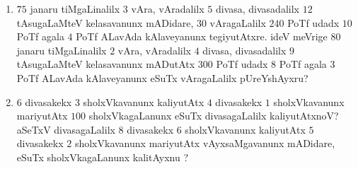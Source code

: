 \begin{enumerate}[\rm (1)]
\item $75$ janaru tiMgaLinalilx $3$ vAra, vAradalilx $5$ divasa, divasadalilx $12$ tAsugaLaMteV kelasavanunx mADidare, $30$ vAragaLalilx $240$ PoTf udadx $10$ PoTf agala $4$ PoTf ALavAda kAlaveyanunx tegiyutAtxre. ideV meVrige $80$ janaru tiMgaLinalilx $2$ vAra, vAradalilx $4$ divasa, divasadalilx $9$ tAsugaLaMteV kelasavanunx mADutAtx $300$ PoTf udadx $8$ PoTf agala $3$ PoTf ALavAda kAlaveyanunx eSuTx vAragaLalilx pUreYshAyxru?

\item $6$ divasakekx $3$ sholxVkavanunx kaliyutAtx $4$ divasakekx $1$ sholxVkavanunx mariyutAtx $100$ sholxVkagaLanunx eSuTx divasagaLalilx kaliyutAtxnoV? aSeTxV divasagaLalilx $8$ divasakekx $6$ sholxVkavanunx kaliyutAtx $5$ divasakekx $2$ sholxVkavanunx mariyutAtx vAyxsaMgavanunx mADidare, eSuTx sholxVkagaLanunx kalitAyxnu ?
\end{enumerate}


